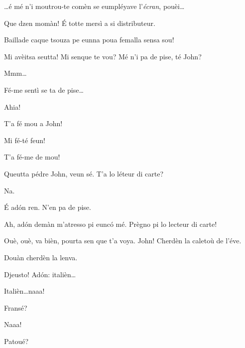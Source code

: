 \begin{drama}

\Jackspeaks \ldots é mé n'i moutrou-te comèn se eumpléyave l'\textit{écran}, pouèi\ldots


\Johnspeaks Que dzen momàn!  \'E totte mersì a si distributeur.


\Matassaspeaks Baillade caque tsouza pe eunna poua femalla sensa sou!

\Jackspeaks Mi avèitsa seutta! Mi senque te vou?  Mé n'i pa de pise, té John?

\Johnspeaks Mmm\ldots

\Jackspeaks\direct{\malisieu} Fé-me sentì se ta de pise\ldots


\Johnspeaks Ahia!

\Jackspeaks{} T'a fé mou a John!

\Prosperospeaks{} Mi fé-té feun!

\Johnspeaks T'a fé-me de mou!

\Jackspeaks Queutta pédre John, veun sé.  T'a lo léteur di carte?

\Matassaspeaks Na.

\Jackspeaks \'E ad\'on ren. N'en pa de pise.

\Matassaspeaks Ah, ad\'on demàn m'atresso pi eunc\'o mé. Prègno pi lo lecteur di carte!

\Jackspeaks  Ouè, ouè, va bièn, pourta sen que t'a voya.  John! Cherdèn la caletoù de l'éve.

\Johnspeaks Douàn cherdèn la lenva.

\Jackspeaks  Djeusto! Ad\'on: italièn\ldots

\Johnspeaks Italièn\ldots naaa!


\Jackspeaks Fransé?

\Johnspeaks Naaa!

\Jackspeaks Patoué?


\end{drama}
